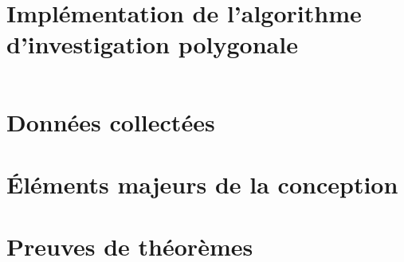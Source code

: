 \documentclass[francais,RandD]{rapportPFE}
\begin{document}
	\section{Implémentation de l'algorithme d'investigation polygonale}
		\begin{lstlisting}[language=Python,caption={Implémentation de l'algorithme d'investigation polygonale},label=lst:investigation_polygonale]
		\end{lstlisting}
	\section{Données collectées}
	\section{Éléments majeurs de la conception}
	\section{Preuves de théorèmes}
\end{document}
